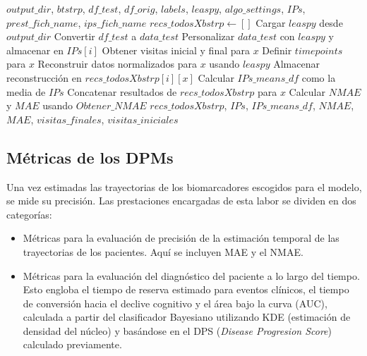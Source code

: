 \begin{algorithm}
	\caption{Leaspy\_Test\_personalization}
	\begin{algorithmic}[1]
		\REQUIRE $output\_dir$, $btstrp$, $df\_test$, $df\_orig$, $labels$, $leaspy$, $algo\_settings$, $IPs$, $prest\_fich\_name$, $ips\_fich\_name$
		\STATE $recs\_todosXbstrp \gets []$
		\STATE Cargar $leaspy$ desde $output\_dir$
		\STATE Convertir $df\_test$ a $data\_test$
		\STATE Personalizar $data\_test$ con $leaspy$ y almacenar en $IPs[i]$
		\STATE Obtener visitas inicial y final para $x$
		\STATE Definir $timepoints$ para $x$
		\STATE Reconstruir datos normalizados para $x$ usando $leaspy$
		\STATE Almacenar reconstrucción en $recs\_todosXbstrp[i][x]$
		\ENDFOR
		\ENDFOR
		\STATE Calcular $IPs\_means\_df$ como la media de $IPs$
		\STATE Concatenar resultados de $recs\_todosXbstrp$ para $x$
		\ENDFOR
		\STATE Calcular $NMAE$ y $MAE$ usando $Obtener\_NMAE$
		\RETURN $recs\_todosXbstrp$, $IPs$, $IPs\_means\_df$, $NMAE$, $MAE$, $visitas\_finales$, $visitas\_iniciales$
	\end{algorithmic}
\end{algorithm}
	
	
\subsection{Métricas de los DPMs}
Una vez estimadas las trayectorias de los biomarcadores escogidos para el modelo, se mide su precisión. Las prestaciones encargadas de esta labor se dividen en dos categorías:
\begin{itemize}
	\item Métricas para la evaluación de precisión de la estimación temporal de las trayectorias de los pacientes. Aquí se incluyen MAE y el NMAE.
	\item Métricas para la evaluación del diagnóstico del paciente a lo largo del tiempo. Esto engloba el tiempo de reserva estimado para eventos clínicos, el tiempo de conversión hacia el declive cognitivo y el área bajo la curva (AUC), calculada a partir del clasificador Bayesiano utilizando KDE (estimación de densidad del núcleo) y basándose en el DPS (\textit{Disease Progresion Score}) calculado previamente.
\end{itemize}

